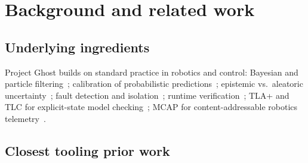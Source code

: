 \documentclass[acmsmall,nonacm=true,review=false]{acmart}
\theoremstyle{plain}
\begin{document}
\section{Background and related work}
\label{sec:related}

\subsection{Underlying ingredients}

Project Ghost builds on standard practice in robotics and control:
Bayesian and particle filtering~\cite{thrun2005probabilistic};
calibration of probabilistic
predictions~\cite{vovk2005algorithmic}; epistemic vs.\ aleatoric
uncertainty~\cite{kendall2017uncertainties}; fault detection and
isolation~\cite{isermann2006fdi}; runtime
verification~\cite{bartocci2018lectures}; TLA+ and TLC for
explicit-state model checking~\cite{lamport2002specifying}; MCAP for
content-addressable robotics telemetry~\cite{foxglove2022mcap}.

\subsection{Closest tooling prior work}
\end{document}
